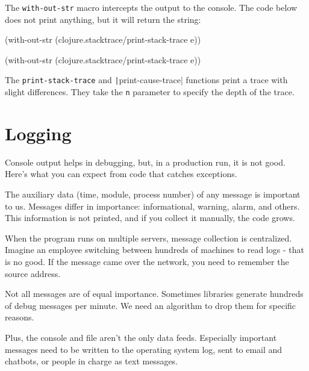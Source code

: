 \fi

The \verb|with-out-str| macro intercepts the output to the console. The code below does not print anything, but it will return the string:

\ifx\DEVICETYPE\MOBILE

\begin{english}
  \begin{clojure}
(with-out-str
  (clojure.stacktrace/print-stack-trace
    e))
  \end{clojure}
\end{english}

\else

\begin{english}
  \begin{clojure}
(with-out-str
  (clojure.stacktrace/print-stack-trace e))
  \end{clojure}
\end{english}

\fi

The \verb|print-stack-trace| and \texttt|print-cause\--trace| functions print a trace with slight differences. They take the \verb|n| parameter to specify the depth of the trace.

\section{Logging}


Console output helps in debugging, but, in a production run, it is not good. Here's what you can expect from code that catches exceptions.

The auxiliary data (time, module, process number) of any message is important to us. Messages differ in importance: informational, warning, alarm, and others. This information is not printed, and if you collect it manually, the code grows.

When the program runs on multiple servers, message collection is centralized. Imagine an employee switching between hundreds of machines to read logs - that is no good. If the message came over the network, you need to remember the source address.

Not all messages are of equal importance. Sometimes libraries generate hundreds of debug messages per minute. We need an algorithm to drop them for specific reasons.

Plus, the console and file aren't the only data feeds. Especially important messages need to be written to the operating system log, sent to email and chatbots, or people in charge as text messages.

